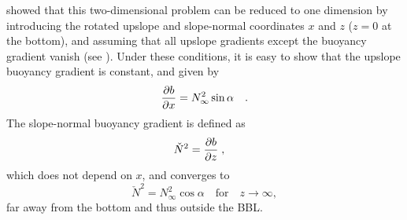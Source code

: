 \cite{UmlaufBurchard2011a} showed that this two-dimensional problem
can be reduced to one dimension by introducing the rotated upslope and
slope-normal coordinates $x$ and $z$ ($z=0$ at the bottom), and assuming that all upslope
gradients except the buoyancy gradient vanish (see ). Under
these conditions, it is easy to show that the upslope buoyancy
gradient is constant, and given by
\begin{equation}
  \label{dbdx}
    \dfrac{\partial {b}}{\partial {x}} = N^2_\infty \sin \alpha  
    \quad .
\end{equation}
The slope-normal buoyancy gradient is defined as
\begin{equation}
  \label{NNcheck}
   \check{N}^2  = \dfrac{\partial {b}}{\partial {z}} \; , \quad 
\end{equation}
which does not depend on $x$, and converges to
\begin{equation}
 \label{NNinfconv}
 \check{N}^2 = N^2_\infty \cos \alpha \quad \text{for} \quad z
 \rightarrow \infty \comma
\end{equation}
far away from the bottom and thus outside the BBL.

